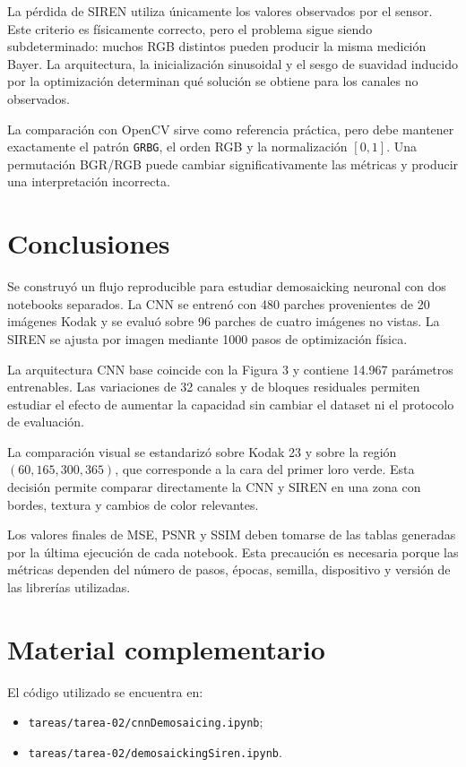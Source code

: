 \documentclass[11pt,a4paper]{article}
\begin{document}
La pérdida de SIREN utiliza únicamente los valores observados por el sensor. Este criterio es físicamente correcto, pero el problema sigue siendo subdeterminado: muchos RGB distintos pueden producir la misma medición Bayer. La arquitectura, la inicialización sinusoidal y el sesgo de suavidad inducido por la optimización determinan qué solución se obtiene para los canales no observados.

La comparación con OpenCV sirve como referencia práctica, pero debe mantener exactamente el patrón \texttt{GRBG}, el orden RGB y la normalización $[0,1]$. Una permutación BGR/RGB puede cambiar significativamente las métricas y producir una interpretación incorrecta.

\section{Conclusiones}

Se construyó un flujo reproducible para estudiar demosaicking neuronal con dos notebooks separados. La CNN se entrenó con 480 parches provenientes de 20 imágenes Kodak y se evaluó sobre 96 parches de cuatro imágenes no vistas. La SIREN se ajusta por imagen mediante 1000 pasos de optimización física.

La arquitectura CNN base coincide con la Figura 3 y contiene 14.967 parámetros entrenables. Las variaciones de 32 canales y de bloques residuales permiten estudiar el efecto de aumentar la capacidad sin cambiar el dataset ni el protocolo de evaluación.

La comparación visual se estandarizó sobre Kodak 23 y sobre la región $(60,165,300,365)$, que corresponde a la cara del primer loro verde. Esta decisión permite comparar directamente la CNN y SIREN en una zona con bordes, textura y cambios de color relevantes.

Los valores finales de MSE, PSNR y SSIM deben tomarse de las tablas generadas por la última ejecución de cada notebook. Esta precaución es necesaria porque las métricas dependen del número de pasos, épocas, semilla, dispositivo y versión de las librerías utilizadas.

\section{Material complementario}

El código utilizado se encuentra en:

\begin{itemize}
    \item \texttt{tareas/tarea-02/cnnDemosaicing.ipynb};
    \item \texttt{tareas/tarea-02/demosaickingSiren.ipynb}.
\end{itemize}
\end{document}
